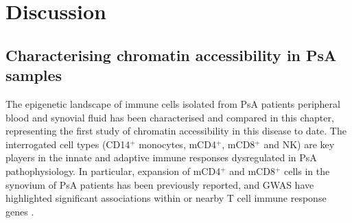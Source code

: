 
 

\section{Discussion}


\subsection{Characterising chromatin accessibility in PsA samples}


The epigenetic landscape of immune cells isolated from PsA patients peripheral blood and synovial fluid has been characterised and compared in this chapter, representing the first study of chromatin accessibility in this disease to date. The interrogated cell types (CD14$^+$ monocytes, mCD4$^+$, mCD8$^+$ and NK) are key players in the innate and adaptive immune responses dysregulated in PsA pathophysiology. In particular, expansion of mCD4$^+$ and mCD8$^+$ cells in the synovium of PsA patients has been previously reported, and GWAS have highlighted significant associations within or nearby T cell immune response genes \parencite{Taams2018}.

